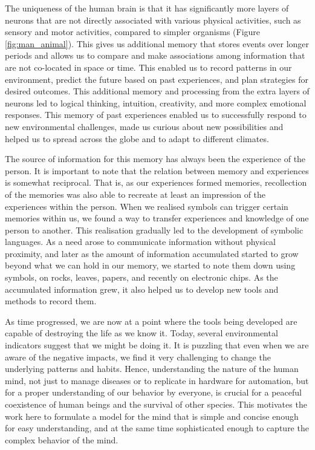 \documentclass[reprint,amsmath,amssymb,apr,aip,onecolumn, 11pt]{revtex4-1}
\begin{document}
	The uniqueness of the human brain is that it has significantly more layers of neurons that are not directly associated with various physical activities, such as sensory and motor activities, compared to simpler organisms\cite{2014_Hofman, 2011_DeFelipe} (Figure \ref{fig:man_animal}). This gives us additional memory that stores events over longer periods and allows us to compare and make associations among information that are not co-located in space or time. This enabled us to record patterns in our environment, predict the future based on past experiences, and plan strategies for desired outcomes. This additional memory and processing from the extra layers of neurons led to logical thinking, intuition, creativity, and more complex emotional responses. This memory of past experiences enabled us to successfully respond to new environmental challenges, made us curious about new possibilities and helped us to spread across the globe and to adapt to different climates. 
	
	
	
	The source of information for this memory has always been the experience of the person. It is important to note that the relation between memory and experiences is somewhat reciprocal\cite{Canli_2000, Tyng_2017}. That is, as our experiences formed memories, recollection of the memories was also able to recreate at least an impression of the experiences within the person.  When we realised symbols can trigger certain memories within us, we found a way to transfer experiences and knowledge of one person to another. This realisation gradually led to the development of symbolic languages. As a need arose to communicate information without physical proximity, and later as the amount of information accumulated started to grow beyond what we can hold in our memory, we started to note them down using symbols, on rocks, leaves, papers, and recently on electronic chips. As the accumulated information grew, it also helped us to develop new tools and methods to record them.
	
	As time progressed, we are now at a point where the tools being developed are capable of destroying the life as we know it. Today, several environmental indicators suggest that we might be doing it. It is puzzling that even when we are aware of the negative impacts, we find it very challenging to change the underlying patterns and habits. Hence, understanding the nature of the human mind, not just to manage diseases or to replicate in hardware for automation, but for a proper understanding of our behavior by everyone, is crucial for a peaceful coexistence of human beings and the survival of other species. This motivates the work here to formulate a model for the mind that is simple and concise enough for easy understanding, and at the same time sophisticated enough to capture the complex behavior of the mind. 
	
\end{document}
